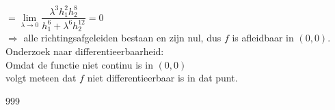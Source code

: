 \documentclass[a4paper]{article}
\begin{document}
$= \lim\limits_{\lambda \to 0} \dfrac{\lambda^3 h_1^2 h_2^8}{h_1^6 + \lambda^6 h_2^{12}} = 0$ \\

$\Rightarrow$ alle richtingsafgeleiden bestaan en zijn nul, dus $f$ is afleidbaar in $(0,0)$. \\

Onderzoek naar differentieerbaarheid: \\

Omdat de functie niet continu is in $(0,0)$ \\

volgt meteen dat $f$ niet differentieerbaar is in dat punt. \\

\begin{thebibliography}{999}
\end{thebibliography}
\end{document}
